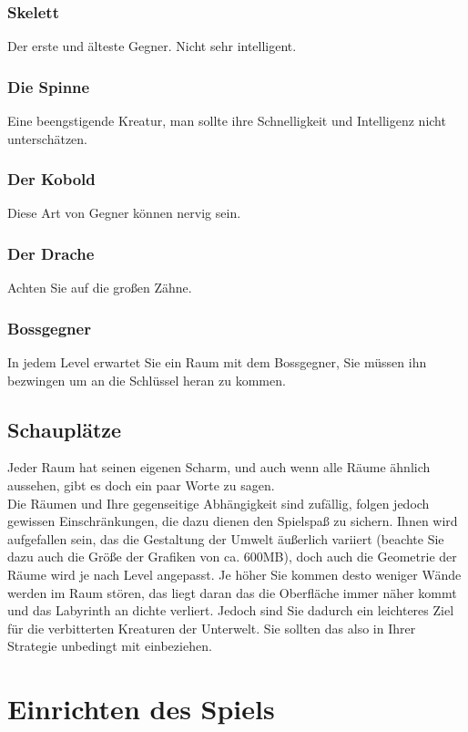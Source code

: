 \documentclass[12pt, a4paper]{scrreprt}
\begin{document}
\subsection*{Skelett}
Der erste und älteste Gegner. Nicht sehr intelligent.
\subsection*{Die Spinne}
Eine beengstigende Kreatur, man sollte ihre Schnelligkeit und Intelligenz nicht unterschätzen.
\subsection*{Der Kobold}
Diese Art von Gegner können nervig sein.
\subsection*{Der Drache}
Achten Sie auf die großen Zähne.
\subsection*{Bossgegner}
In jedem Level erwartet Sie ein Raum mit dem Bossgegner, Sie müssen ihn bezwingen um an die Schlüssel heran zu kommen.
\section{Schauplätze}
Jeder Raum hat seinen eigenen Scharm, und auch wenn alle Räume ähnlich aussehen, gibt es doch ein paar Worte zu sagen.\\
Die Räumen und Ihre gegenseitige Abhängigkeit sind zufällig, folgen jedoch gewissen Einschränkungen, die dazu dienen den Spielspaß zu sichern. Ihnen wird aufgefallen sein, das die Gestaltung der Umwelt äußerlich variiert (beachte Sie dazu auch die Größe der Grafiken von ca. 600MB), doch auch die Geometrie der Räume wird je nach Level angepasst. Je höher Sie kommen desto weniger Wände werden im Raum stören, das liegt daran das die Oberfläche immer näher kommt und das Labyrinth an dichte verliert. Jedoch sind Sie dadurch ein leichteres Ziel für die verbitterten Kreaturen der Unterwelt. Sie sollten das also in Ihrer Strategie unbedingt mit einbeziehen.
\chapter{Einrichten des Spiels}
\end{document}
